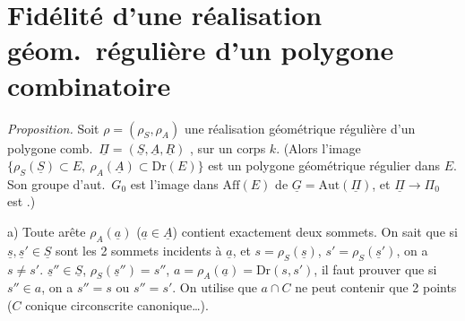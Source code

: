 \documentclass[11pt,a4paper]{article}
\begin{document}
\section{Fidélité d'une réalisation géom.\ régulière d'un polygone combinatoire}


\emph{Proposition.} Soit $\rho = (\rho_S, \rho_A)$ une réalisation géométrique régulière d'un polygone comb.\ $\underline{\Pi} = (\underline{S}, \underline{A}, \underline{R})$ , sur un corps $k$. (Alors l'image $\{\rho_S(\underline{S}) \subset E,\ \rho_A(\underline{A}) \subset \mathrm{Dr}(E)\}$ est un polygone géométrique  régulier dans $E$. Son groupe d'aut.\ $G_0$ est l'image dans $\mathrm{Aff}(E)$ de $\underline{G} = \mathrm{Aut}(\underline{\Pi})$, et $\underline{\Pi} \to \Pi_0$ est .)


a) Toute arête $\rho_A(\underline{a})$ ($\underline{a} \in \underline{A}$) contient exactement deux sommets. On sait que si $\underline{s}, \underline{s}' \in \underline{S}$ sont les 2 sommets incidents à $\underline{a}$, et $s = \rho_S(\underline{s})$, $s' = \rho_S(\underline{s}')$, on a $s \neq s'$.   \struck{$\forall$} $\underline{s}'' \in \underline{S}$,  $\rho_S(\underline{s}'') = s''$,  $a = \rho_A(\underline{a}) = \mathrm{Dr}(s, s')$, il faut prouver que si $s'' \in a$, on a $s'' = s$ ou $s'' = s'$. On utilise  que $a \cap C$ ne peut contenir que 2 points ($C$ conique circonscrite canonique…).
\end{document}
